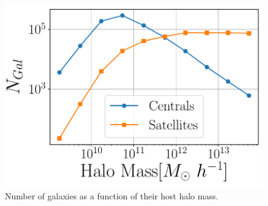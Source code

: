 \documentclass[a4paper,fleqn,usenatbib]{mnras}
\begin{document}
\begin{figure}
    \centering
     \includegraphics[width=1\columnwidth]{figuras/Number_Galaxies.pdf}
    \caption{Number of galaxies as a function of their host halo mass.}
    \label{fig:abundance}
\end{figure}
\end{document}
